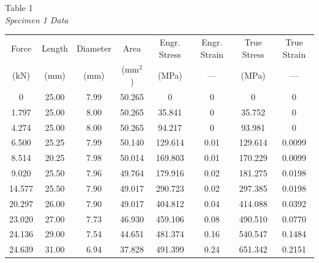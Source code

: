 \documentclass[12pt]{article}
\begin{document}
\begin{center}
Table 1 
\\
\emph{Specimen 1 Data}
\\
\bigskip
\begin{tabular}{ c c c c c c c c }
\hline
Force & Length & Diameter & Area & Engr. Stress & Engr. Strain & True Stress & True Strain\\
(kN)    & (mm)   & (mm) &(mm$^2$)& (MPa)   & ---  & (MPa)   & ---    \\
\hline
0     & 25.00  & 7.99 & 50.265 & 0       & 0    & 0       & 0      \\
1.797   & 25.00  & 8.00 & 50.265 & 35.841  & 0    & 35.752  & 0      \\
4.274   & 25.00  & 8.00 & 50.265 & 94.217  & 0    & 93.981  & 0      \\
6.500   & 25.25  & 7.99 & 50.140 & 129.614 & 0.01 & 129.614 & 0.0099 \\
8.514   & 20.25  & 7.98 & 50.014 & 169.803 & 0.01 & 170.229 & 0.0099 \\
9.020   & 25.50  & 7.96 & 49.764 & 179.916 & 0.02 & 181.275 & 0.0198 \\
14.577  & 25.50  & 7.90 & 49.017 & 290.723 & 0.02 & 297.385 & 0.0198 \\
20.297  & 26.00  & 7.90 & 49.017 & 404.812 & 0.04 & 414.088 & 0.0392 \\
23.020  & 27.00  & 7.73 & 46.930 & 459.106 & 0.08 & 490.510 & 0.0770 \\
24.136  & 29.00  & 7.54 & 44.651 & 481.374 & 0.16 & 540.547 & 0.1484 \\
24.639  & 31.00  & 6.94 & 37.828 & 491.399 & 0.24 & 651.342 & 0.2151 \\
\hline
\end{tabular}
\end{center}

\bigskip
\bigskip
\bigskip
\end{document}
